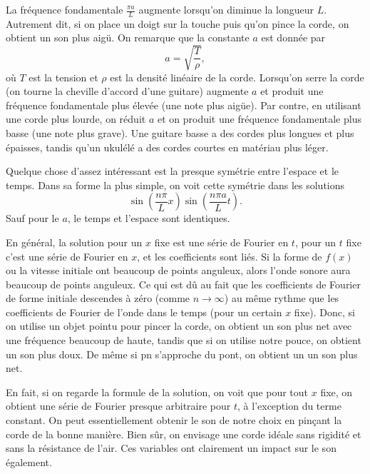 La fréquence fondamentale $\frac{\pi a}{L}$ augmente lorsqu'on diminue la longueur $ L $.  Autrement dit,  si
on place un doigt sur la touche puis qu'on pince la corde,  on obtient un son plus aigü.
On remarque que la constante $ a $ est donnée par
\begin{equation*}
a = \sqrt{\frac{T}{\rho}} ,
\end{equation*}
où $T$ est la tension et  $\rho$ est la densité linéaire de la corde.
Lorsqu'on serre la corde (on tourne la cheville d'accord d'une guitare) augmente $ a $ et
produit une fréquence fondamentale plus élevée (une note plus aigüe).
Par contre, en utilisant une corde plus lourde,  on
réduit $ a $ et on produit une fréquence fondamentale plus basse (une note plus grave).
Une guitare basse a des cordes plus longues et plus épaisses,  tandis qu'un ukulélé a des cordes courtes
en matériau plus léger.

Quelque chose d'assez intéressant est la presque symétrie entre l'espace et le temps.
Dans sa forme la plus simple,  on voit cette symétrie dans les solutions
\begin{equation*}
\sin \left( \frac{n \pi}{L} x \right)
\sin \left( \frac{n \pi a}{L} t \right)  .
\end{equation*}
Sauf pour le $ a $, le temps et l'espace sont identiques.

En général, la solution pour un $ x $ fixe est une série de Fourier en $ t $,  pour
un $ t $ fixe c'est une série de Fourier en $ x $,  et les coefficients sont liés.
Si la forme de $ f (x) $ ou la vitesse initiale ont beaucoup de points anguleux,  alors
l'onde sonore aura beaucoup de points anguleux.  Ce qui est dû au fait que les coefficients de Fourier
de forme initiale descendes à zéro (comme $n \to \infty$) au même rythme que les coefficients de Fourier
de l'onde dans le temps (pour un certain $ x $ fixe).  Donc,  si on utilise un objet pointu pour
pincer la corde,  on obtient un son plus net avec une fréquence beaucoup de haute, tandis que si on utilise notre pouce,  on obtient un son plus doux.  De même si pn s'approche du pont,  on obtient un 
un son plus net.

En fait,  si on regarde la formule de la solution,  on voit que pour tout
 $ x $ fixe, on obtient une série de Fourier presque arbitraire pour $ t $,  à l'exception du 
terme constant.  On peut essentiellement obtenir le son de notre choix
en pinçant la corde de la bonne manière.
Bien sûr,  on  envisage une corde idéale sans rigidité et sans la résistance de l'air.  Ces variables ont clairement un impact sur le son également.

